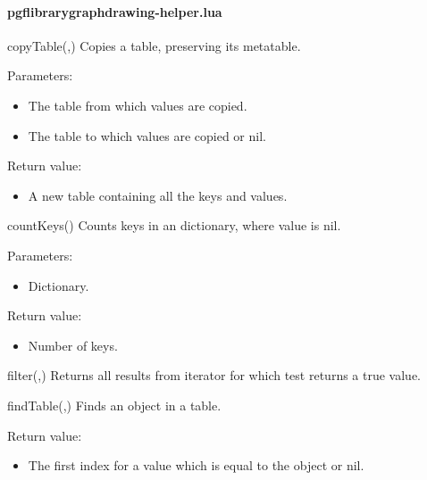 
\paragraph{pgflibrarygraphdrawing-helper.lua}


\begin{luacommand}{{copyTable}(,)}
Copies a table, preserving its metatable.

Parameters:
\begin{itemize}
	\item[]  \subitem The table from which values are copied.\item[]  \subitem The table to which values are copied or nil.
\end{itemize}


Return value:
\begin{itemize} \item[] A new table containing all the keys and values. \end{itemize}


\end{luacommand}\begin{luacommand}{{countKeys}()}
Counts keys in an dictionary, where value is nil.

Parameters:
\begin{itemize}
	\item[]  \subitem Dictionary.
\end{itemize}


Return value:
\begin{itemize} \item[] Number of keys. \end{itemize}


\end{luacommand}\begin{luacommand}{{filter}(,)}
Returns all results from iterator for which test returns a true value.



\end{luacommand}\begin{luacommand}{{findTable}(,)}
Finds an object in a table.


Return value:
\begin{itemize} \item[] The first index for a value which is equal to the object or nil. \end{itemize}



\end{luacommand}
